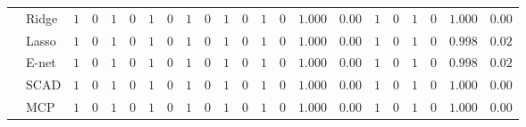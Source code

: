 \begin{tabular}{ll|ll|llllll|llllll|llllll}
 & Ridge  & $1$ & $0$ & $1$ & $0$ & $1$ & $0$ & $1$ & $0$ & $1$ & $0$ & $1$ & $0$ & $1.000$ & $0.00$ & $1$ & $0$ & $1$ & $0$ & $1.000$ & $0.00$ \\
 & Lasso  & $1$ & $0$ & $1$ & $0$ & $1$ & $0$ & $1$ & $0$ & $1$ & $0$ & $1$ & $0$ & $1.000$ & $0.00$ & $1$ & $0$ & $1$ & $0$ & $0.998$ & $0.02$ \\
 & E-net  & $1$ & $0$ & $1$ & $0$ & $1$ & $0$ & $1$ & $0$ & $1$ & $0$ & $1$ & $0$ & $1.000$ & $0.00$ & $1$ & $0$ & $1$ & $0$ & $0.998$ & $0.02$ \\
 & SCAD  & $1$ & $0$ & $1$ & $0$ & $1$ & $0$ & $1$ & $0$ & $1$ & $0$ & $1$ & $0$ & $1.000$ & $0.00$ & $1$ & $0$ & $1$ & $0$ & $1.000$ & $0.00$ \\
 & MCP  & $1$ & $0$ & $1$ & $0$ & $1$ & $0$ & $1$ & $0$ & $1$ & $0$ & $1$ & $0$ & $1.000$ & $0.00$ & $1$ & $0$ & $1$ & $0$ & $1.000$ & $0.00$ \\
\hline 
\end{tabular}

